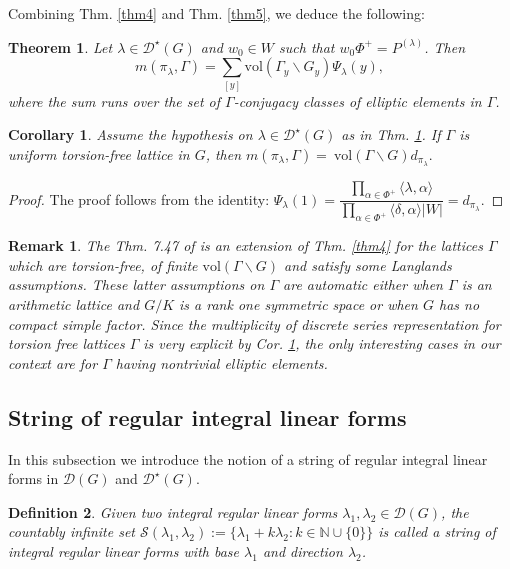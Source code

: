 \documentclass[11 pt]{amsart}
\newcommand{\N}{{\mathbb N}}
\newtheorem{theorem}{Theorem}[section]
\newtheorem{corollary}{Corollary}[section]
\theoremstyle{definition}
\newtheorem{definition}[theorem]{Definition}
\newtheorem{remark}{Remark}[section]
\numberwithin{equation}{section}
\begin{document}
\noindent Combining Thm. \ref{thm4} and Thm. \ref{thm5}, we deduce the following:

\begin{theorem}\label{thm6}
\textit{Let $\lambda \in \mathcal{D}^{\star}(G)$ and $w_0 \in W$ such that $w_0 \Phi^+=P^{(\lambda)}$. Then $$m(\pi_{\lambda}, \Gamma) =\sum\limits_{[y]} \text{vol}(\Gamma_y \backslash G_y) \Psi_{\lambda}(y),$$ where the sum runs over the set of $\Gamma$-conjugacy classes of elliptic elements in $\Gamma$.}
\end{theorem}

\begin{corollary}\label{corvolume}
Assume the hypothesis on $\lambda \in \mathcal{D}^{\star}(G)$ as in Thm. \ref{thm6}. If $\Gamma$ is uniform torsion-free lattice in $G$, then $m(\pi_{\lambda}, \Gamma)=\ \text{vol}(\Gamma \backslash G) d_{\pi_{\lambda}}.$
\end{corollary}

\begin{proof}
The proof follows from the identity: $\Psi_{\lambda}(1)= \dfrac{\prod \limits_{\alpha \in \Phi^+} \langle \lambda , \alpha \rangle}{\prod \limits_{\alpha \in \Phi^+} \langle \delta , \alpha \rangle |W|}=d_{\pi_{\lambda}}$.
\end{proof}

\begin{remark}
\textit{The Thm. 7.47 of \cite{FW} is an extension of Thm. \ref{thm4} for the lattices $\Gamma$ which are torsion-free, of finite $\text{vol} (\Gamma \backslash G)$ and satisfy some Langlands assumptions. These latter assumptions on $\Gamma$ are automatic either when $\Gamma$ is an arithmetic lattice and $G/K$ is a rank one symmetric space or when $G$ has no compact simple factor. Since the multiplicity of discrete series representation for torsion free lattices $\Gamma$ is very explicit by Cor. \ref{corvolume}, the only interesting cases in our context are for $\Gamma$ having nontrivial elliptic elements.} 
\end{remark}

\subsection{String of regular integral linear forms}\label{sec-2-4}
In this subsection we introduce the notion of a string of regular integral linear forms in $\mathcal{D}(G)$ and $\mathcal{D}^{\star}(G)$.  
\begin{definition}\label{def-2-4}
\textit{Given two integral regular linear forms $\lambda_1 , \lambda_2 \in \mathcal{D}(G)$, the countably infinite set $\mathcal{S}(\lambda_1 , \lambda_2) := \{ \lambda_1 + k \lambda_2 : k \in \N \cup \{0\} \}$ is called a string of integral regular linear forms with base $\lambda_1$ and direction $\lambda_2$.} 
\end{definition}
\end{document}
